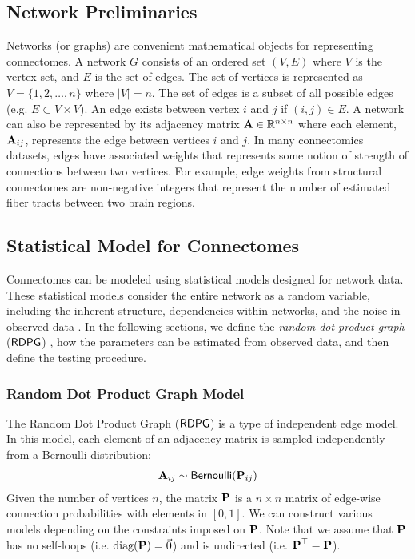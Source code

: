 \subsection{Network Preliminaries} \label{sec:graph}
Networks (or graphs) are convenient mathematical objects for representing connectomes. A network $G$ consists of an ordered set $(V, E)$ where $V$ is the vertex set, and $E$ is the set of edges. The set of vertices is represented as $V=\{1, 2, \ldots, n\}$ where $|V| = n$. The set of edges is a subset of all possible edges (e.g. $E\subset V\times V$). An edge exists between vertex $i$ and $j$ if $(i, j)\in E$. A network can also be represented by its adjacency matrix $\A \in \mathbb R^{n\times n}$ where each element, $\A_{ij}$, represents the edge between vertices $i$ and $j$. In many connectomics datasets, edges have associated weights that represents some notion of strength of connections between two vertices. For example, edge weights from structural connectomes are non-negative integers that represent the number of estimated fiber tracts between two brain regions. 

\subsection{Statistical Model for Connectomes} \label{sec:statistical-models}
Connectomes can be modeled using statistical models designed for network data. These statistical models consider the entire network as a random variable, including the inherent structure, dependencies within networks, and the noise in observed data \cite{goldenberg2010survey, kolaczyk2014statistical, chung2021statistical}. In the following sections, we define the \textit{random dot product graph} ($\rdpg$) \cite{athreya2018, sussman2012consistent}, how the parameters can be estimated from observed data, and then define the testing procedure. 

\subsubsection{Random Dot Product Graph Model}  \label{sec:rdpg}
The Random Dot Product Graph ($\rdpg$) is a type of independent edge model. In this model, each element of an adjacency matrix is sampled independently from a Bernoulli distribution:
\begin{align*}
    \A_{ij} \sim \bern(\P_{ij})
\end{align*}
Given the number of vertices $n$, the matrix $\P$ is a $n\times n$ matrix of edge-wise connection probabilities with elements in $[0, 1]$. We can construct various models depending on the constraints imposed on $\P$. Note that we assume that $\P$ has no self-loops (i.e. $\text{diag}(\P) = \vec 0$) and is undirected (i.e. $\P^\top = \P$). 

